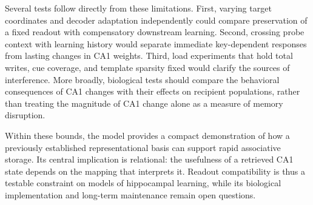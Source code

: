 Several tests follow directly from these limitations. First, varying target
coordinates and decoder adaptation independently could compare preservation
of a fixed readout with compensatory downstream learning. Second, crossing
probe context with learning history would separate immediate key-dependent
responses from lasting changes in CA1 weights. Third, load experiments that
hold total writes, cue coverage, and template sparsity fixed would clarify
the sources of interference. More broadly, biological tests should compare
the behavioral consequences of CA1 changes with their effects on recipient
populations, rather than treating the magnitude of CA1 change alone as a
measure of memory disruption.

Within these bounds, the model provides a compact demonstration of how a
previously established representational basis can support rapid associative
storage. Its central implication is relational: the usefulness of a retrieved
CA1 state depends on the mapping that interprets it. Readout compatibility is
thus a testable constraint on models of hippocampal learning, while its
biological implementation and long-term maintenance remain open questions.
